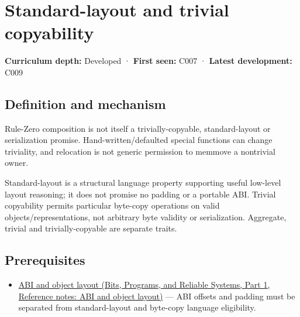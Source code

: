 \hypertarget{appendix-958870a64c53}{}\label{referencestart:appendix-958870a64c53}
\section{Standard-layout and trivial copyability}\label{appendix-958870a64c53-standard-layout-and-trivial-copyability}

\hypertarget{appendix-958870a64c53-standard-layout-and-trivial-copyability}{}

\textbf{Curriculum depth:} Developed · \textbf{First seen:} C007 · \textbf{Latest development:} C009

\begin{allmightroledefinition}

\subsection{Definition and mechanism}\label{appendix-958870a64c53-definition-and-mechanism}

\hypertarget{appendix-958870a64c53-definition-and-mechanism}{}

Rule-Zero composition is not itself a trivially-copyable, standard-layout or serialization promise. Hand-written/defaulted special functions can change triviality, and relocation is not generic permission to memmove a nontrivial owner.

\end{allmightroledefinition}

Standard-layout is a structural language property supporting useful low-level layout reasoning; it does not promise no padding or a portable ABI. Trivial copyability permits particular byte-copy operations on valid objects/representations, not arbitrary byte validity or serialization. Aggregate, trivial and trivially-copyable are separate traits.

\subsection{Prerequisites}\label{appendix-958870a64c53-prerequisites}

\hypertarget{appendix-958870a64c53-prerequisites}{}

\begin{itemize}
\tightlist
\item
  \href{../01-Bits-Programs-and-Reliable-Systems-P01/main.pdf\#appendix-c4ac6bb0fff8}{ABI and object layout (Bits, Programs, and Reliable Systems, Part 1, Reference notes: ABI and object layout)} --- ABI offsets and padding must be separated from standard-layout and byte-copy language eligibility.
\end{itemize}

